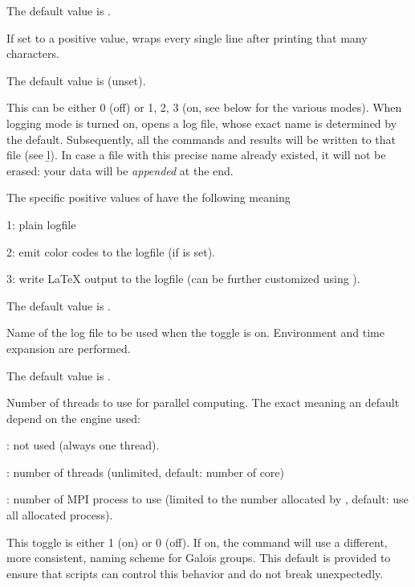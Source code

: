 {The default value is .

\label{se:def,linewrap}
If set to a positive value,  wraps every single line after
printing that many characters.

The default value is  (unset).

\label{se:def,log}
This can be either 0 (off) or 1, 2, 3
(on, see below for the various modes). When logging mode is turned on, 
opens a log file, whose exact name is determined by the 
default. Subsequently, all the commands and results will be written to that
file (see \b{l}). In case a file with this precise name already existed, it
will not be erased: your data will be \emph{appended} at the end.

The specific positive values of  have the following meaning

1: plain logfile

2: emit color codes to the logfile (if  is set).

3: write LaTeX output to the logfile (can be further customized using
).

The default value is .

\label{se:def,logfile}
Name of the log file to be used when the  toggle is on.
Environment and time expansion are performed.

The default value is .

\label{se:def,nbthreads}
Number of threads to use for parallel computing.
The exact meaning an default depend on the  engine used:

\item {}: not used (always one thread).

\item {}: number of threads (unlimited, default: number of core)

\item {}: number of MPI process to use (limited to the number allocated by ,
default: use all allocated process).

\label{se:def,new_galois_format}
This toggle is either 1 (on) or 0 (off). If on,
the  command will use a different, more
consistent, naming scheme for Galois groups. This default is provided to
ensure that scripts can control this behavior and do not break unexpectedly.

}
